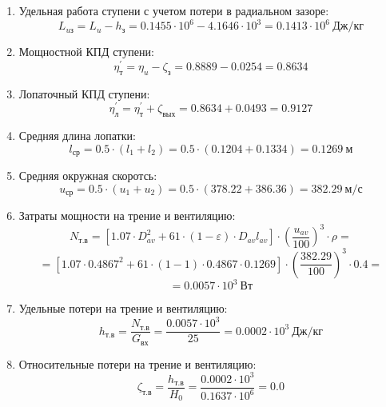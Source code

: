 \documentclass[a4paper,10pt]{article}
\begin{document}
\begin{enumerate}
        \item Удельная работа ступени с учетом потери в радиальном зазоре:
        \[
            L_{uз} = L_u - h_з = 0.1455 \cdot 10^6 -
                4.1646 \cdot 10^3 =
            0.1413 \cdot 10^6 \ Дж/кг
        \]

        \item Мощностной КПД ступени:
        \[
            \eta_т^\prime = \eta_u - \zeta_з =
                0.8889 - 0.0254 = 0.8634
        \]

        \item Лопаточный КПД ступени:
        \[
            \eta_л^\prime = \eta_т^\prime + \zeta_{вых} =
                 0.8634 +  0.0493 =
            0.9127
        \]

        \item Средняя длина лопатки:
        \[
            l_{ср} = 0.5 \cdot (l_1 + l_2) =
                0.5 \cdot (0.1204 + 0.1334) =
            0.1269\ м
        \]

        \item Средняя окружная скоротсь:
        \[
            u_{ср} = 0.5 \cdot (u_1 + u_2) =
                0.5 \cdot (378.22 + 386.36) =
            382.29\ м/с
        \]

        \item Затраты мощности на трение и вентиляцию:
        \[
            N_{т.в} = \left[
                    1.07 \cdot D_{av}^2 + 61 \cdot (1 - \varepsilon) \cdot D_{av} l_{av}
            \right] \cdot
            \left(
                \frac{ u_{av} }{ 100 }
            \right) ^ 3 \cdot
            \rho =
        \]
        \[    = \left[
                1.07 \cdot 0.4867^2 +
                61 \cdot (1 - 1) \cdot
                0.4867 \cdot 0.1269
            \right] \cdot
            \left(
                \frac{ 382.29 }{ 100 }
            \right) ^ 3 \cdot
            0.4=
        \]
        \[
            = 0.0057 \cdot 10^3 \ Вт
        \]

        \item Удельные потери на трение и вентиляцию:
        \[
            h_{т.в} = \frac{ N_{т.в} }{ G_{вх} } =
                \frac{
                    0.0057 \cdot 10^3
                }{
                    25
                }
            = 0.0002 \cdot 10^3 \ Дж/кг
        \]

        \item Относительные потери на трение и вентиляцию:
        \[
            \zeta_{т.в} = \frac{ h_{т.в} }{ H_0 } =
                \frac{ 0.0002 \cdot 10^3 }{ 0.1637 \cdot 10^6 } =
            0.0
        \]


\end{enumerate}
\end{document}
